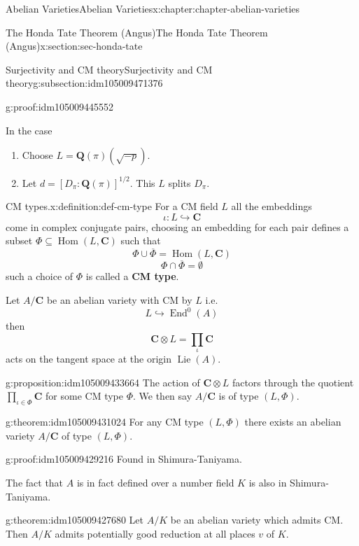 \documentclass[oneside,10pt,]{book}
\newcommand{\terminology}[1]{\textbf{#1}}
\numberwithin{equation}{section}
\DeclareMathOperator{\Lie}{Lie}
\newcommand{\lb}{[}
\newcommand{\rb}{]}
\newcommand{\QQ}{\mathbf{Q}}
\newcommand{\CC}{\mathbf{C}}
\DeclareMathOperator{\End}{End}
\DeclareMathOperator{\Hom}{Hom}
\begin{document}
\begin{chapterptx}{Abelian Varieties}{}{Abelian Varieties}{}{}{x:chapter:chapter-abelian-varieties}
\begin{sectionptx}{The Honda Tate Theorem (Angus)}{}{The Honda Tate Theorem (Angus)}{}{}{x:section:sec-honda-tate}
\begin{subsectionptx}{Surjectivity and CM theory}{}{Surjectivity and CM theory}{}{}{g:subsection:idm105009471376}
\begin{proofptx}{}{g:proof:idm105009445552}
\begin{enumerate}
\end{enumerate}
In the case%
\begin{enumerate}
\item{}Choose \(L = \QQ(\pi)(\sqrt{-p})\).%
\item{}Let \(d= \lb D_\pi: \QQ(\pi)\rb^{1/2}\). This \(L\) splits \(D_\pi\).%
\end{enumerate}
%
\end{proofptx}
\begin{definition}{CM types.}{x:definition:def-cm-type}%
For a CM field \(L\) all the embeddings%
\begin{equation*}
\iota\colon L \hookrightarrow \CC
\end{equation*}
come in complex conjugate pairs, choosing an embedding for each pair defines a subset \(\Phi\subseteq \Hom(L, \CC)\) such that%
\begin{equation*}
\Phi \cup \overline \Phi = \Hom(L,\CC)
\end{equation*}
%
\begin{equation*}
\Phi \cap \overline \Phi = \emptyset
\end{equation*}
such a choice of \(\Phi \) is called a \terminology{CM type}.%
\end{definition}
Let \(A/\CC\) be an abelian variety with CM by \(L\) i.e.%
\begin{equation*}
L\hookrightarrow \End^0(A)
\end{equation*}
then%
\begin{equation*}
\CC\otimes L = \prod_\iota \CC
\end{equation*}
acts on the tangent space at the origin \(\Lie(A)\).%
\begin{proposition}{}{}{g:proposition:idm105009433664}%
The action of \(\CC\otimes L\) factors through the quotient \(\prod_{\iota\in \Phi} \CC\) for some CM type \(\Phi\). We then say \(A/\CC\) is of type \((L,\Phi)\).%
\end{proposition}
\begin{theorem}{}{}{g:theorem:idm105009431024}%
For any CM type \((L,\Phi)\) there exists an abelian variety \(A/\CC\) of type \((L, \Phi)\).%
\end{theorem}
\begin{proofptx}{}{g:proof:idm105009429216}
Found in Shimura-Taniyama.%
\end{proofptx}
The fact that \(A\) is in fact defined over  a number field \(K\) is also in Shimura-Taniyama.%
\begin{theorem}{}{}{g:theorem:idm105009427680}%
Let \(A/K\) be an abelian variety which admits CM. Then \(A/K\) admits potentially good reduction at all places \(v\) of \(K\).%

\end{theorem}
\end{subsectionptx}
\end{sectionptx}
\end{chapterptx}
\end{document}
